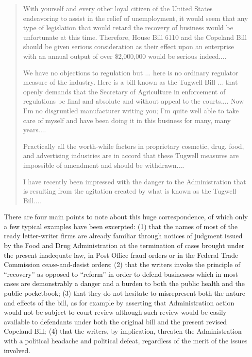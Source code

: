 \documentclass[twoside,nohyper,openany,nobib]{tufte-book}
\begin{document}
\begin{quote}
With yourself and every other loyal citizen of the United States
endeavoring to assist in the relief of unemployment, it would seem that
any type of legislation that would retard the recovery of business would
be unfortunate at this time. Therefore, House Bill 6110 and the Copeland
Bill should be given serious consideration as their effect upon an
enterprise with an annual output of over \$2,000,000 would be serious
indeed....

We have no objections to regulation but ... here is no ordinary
regulator measure of the industry. Here is a bill known as the Tugwell
Bill ... that openly demands that the Secretary of Agriculture in
enforcement of regulations be final and absolute and without appeal to
the courts.... Now I'm no disgruntled manufacturer writing you; I'm
quite well able to take care of myself and have been doing it in this
business for many, many years....

Practically all the worth-while factors in proprietary cosmetic, drug,
food, and advertising industries are in accord that these Tugwell
measures are impossible of amendment and should be withdrawn....

I have recently been impressed with the danger to the Administration
that is resulting from the agitation created by what is known as the
Tugwell Bill....
\end{quote}

There are four main points to note about this huge correspondence, of
which only a few typical examples have been excerpted: (1) that the
names of most of the ready letter-writer firms are already familiar
through notices of judgment issued by the Food and Drug Administration
at the termination of cases brought under the present inadequate law, in
Post Office fraud orders or in the Federal Trade Commission
cease-and-desist orders; (2) that the writers invoke the principle of
``recovery'' as opposed to ``reform'' in order to defend businesses
which in most cases are demonstrably a danger and a burden to both the
public health and the public pocketbook; (3) that they do not hesitate
to misrepresent both the nature and effects of the bill, as for example
by asserting that Administration action would not be subject to court
review although such review would be easily available to defendants
under both the original bill and the present revised Copeland Bill; (4)
that the writers, by implication, threaten the Administration with a
political headache and political defeat, regardless of the merit of the
issues involved.
\end{document}
